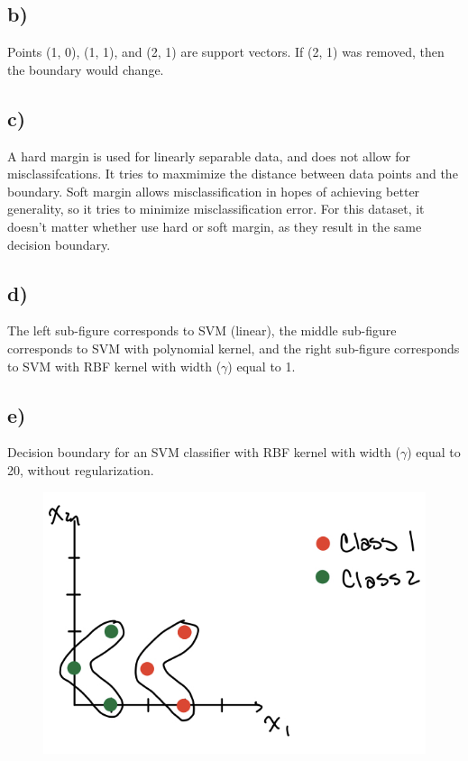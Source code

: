 \documentclass[12pt, letterpaper]{article}
\begin{document}
\subsection*{b)} Points (1, 0), (1, 1), and (2, 1) are support vectors. If (2, 1) was removed, then the boundary would change.

\subsection*{c)} A hard margin is used for linearly separable data, and does not allow for misclassifcations. It tries to maxmimize the distance between data points and the boundary. Soft margin allows misclassification in hopes of achieving better generality, so it tries to minimize misclassification error. For this dataset, it doesn't matter whether use hard or soft margin, as they result in the same decision boundary.

\subsection*{d)} The left sub-figure corresponds to SVM (linear), the middle sub-figure corresponds to SVM with polynomial kernel, and the right sub-figure corresponds to SVM with RBF kernel with width ($\gamma$) equal to 1.

\subsection*{e)}Decision boundary for an SVM classifier with RBF kernel with width ($\gamma$) equal to 20, without regularization.
\FloatBarrier
\begin{figure}[h!]
  \includegraphics[scale=0.33]{./images/8e.jpg}
\end{figure}
\clearpage
\end{document}
